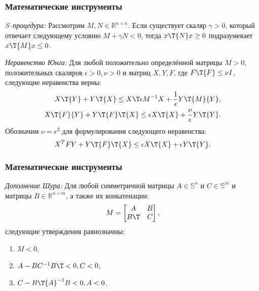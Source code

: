 \begin{frame}
    \frametitle{Математические инструменты}
\emph{S--процедура:}
Рассмотрим ${M},{N} \in \mathbb{R}^{n\times n}$. Если существует скаляр $\gamma>0$, который отвечает следующему условию ${M}+\gamma {N}<0$, тогда $x\T {N} x\geq 0$ подразумевает $x\T{M}x\leq 0$.

\emph{Неравенство Юнга:}
Для любой положительно определённой матрицы $M>0$, положительных скаляров $\epsilon > 0, \nu > 0$ и матриц ${X}, {Y}, {F}$, где ${F}\T{F}\leq \nu{I}$, следующие неравенства верны:
%
\begin{align}
	\label{eq:Young_relation_BMI}
	{X}\T{Y} + {Y}\T{X}  \leq {X}\T 
	\epsilon {M}^{-1}{X} + \frac{1}{\epsilon}   {Y}\T  {M}{Y}, 
	\\
	\label{eq:Young_robust_2}
	{X}\T{F}{Y} + {Y}\T{F}\T{X}  \leq \epsilon {X}\T{X} +  \frac{\nu}{\epsilon} {Y}\T {Y}.
\end{align}
%
Обозначим $\nu=\epsilon^2$ для формулирования следующего неравенства:
%
\begin{equation}
	\label{eq:updated_Young_robust_2}
	{X}^T{F}{Y} + {Y}\T{F}\T{X}  \leq \epsilon {X}\T{X} + \epsilon {Y}\T{Y}.
\end{equation}
\end{frame}

\begin{frame}
	\frametitle{Математические инструменты}
	\emph{Дополнение Шура:}
	Для любой симметричной матрицы ${A}\in \mathbb{S}^n$ и ${C}\in \mathbb{S}^m$ и матрицы ${B}\in \mathbb{R}^{n\times m}$, а также их конкатенации:
	\noindent \begin{align*}
		{M}= \begin{bmatrix}
			{A} & {B} \\
			{B}\T & {C} 
		\end{bmatrix},
	\end{align*}
	следующие утверждения равнозначны:
	\noindent
	\begin{enumerate}
		\item ${M} < 0$,
		\item ${A}-{B}{C}^{-1}{B}\T < 0 , {C}< 0$,
		\item ${C}-{B}\T{A}^{-1}{B}< 0 , {A}< 0$.
	\end{enumerate}
\end{frame}

